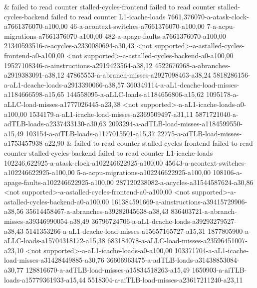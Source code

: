 &
failed to read counter stalled-cycles-frontend failed to read counter stalled-cycles-backend failed to read counter L1-icache-loads 7661,376070-a-atask-clock-a7661376070-a100,00 46-a-acontext-switches-a7661376070-a100,00 7-a-acpu-migrations-a7661376070-a100,00 482-a-apage-faults-a7661376070-a100,00 21340593516-a-acycles-a2330080694-a30,43 <not supported>-a-astalled-cycles-frontend-a0-a100,00 <not supported>-a-astalled-cycles-backend-a0-a100,00 19527108346-a-ainstructions-a2919423564-a38,12 4522676968-a-abranches-a2919383091-a38,12 47865553-a-abranch-misses-a2927098463-a38,24 5818286156-a-aL1-dcache-loads-a2913390066-a38,57 360349114-a-aL1-dcache-load-misses-a1184666598-a15,65 144558095-a-aLLC-loads-a1184656806-a15,62 1095178-a-aLLC-load-misses-a1777026445-a23,38 <not supported>-a-aL1-icache-loads-a0-a100,00 1534179-a-aL1-icache-load-misses-a2369509497-a31,11 5871721040-a-adTLB-loads-a2337433130-a30,63 2093294-a-adTLB-load-misses-a1184599550-a15,49 103154-a-aiTLB-loads-a1177015501-a15,37 22775-a-aiTLB-load-misses-a1753457938-a22,90
&
failed to read counter stalled-cycles-frontend failed to read counter stalled-cycles-backend failed to read counter L1-icache-loads 102246,622925-a-atask-clock-a102246622925-a100,00 45643-a-acontext-switches-a102246622925-a100,00 5-a-acpu-migrations-a102246622925-a100,00 108106-a-apage-faults-a102246622925-a100,00 287120238082-a-acycles-a31544587624-a30,86 <not supported>-a-astalled-cycles-frontend-a0-a100,00 <not supported>-a-astalled-cycles-backend-a0-a100,00 161384591669-a-ainstructions-a39415729906-a38,56 35614458467-a-abranches-a39282045638-a38,43 836403721-a-abranch-misses-a39346990054-a38,49 36796724706-a-aL1-dcache-loads-a39293279527-a38,43 5141353266-a-aL1-dcache-load-misses-a15657165727-a15,31 1877805900-a-aLLC-loads-a15704318172-a15,38 683184078-a-aLLC-load-misses-a23596451007-a23,10 <not supported>-a-aL1-icache-loads-a0-a100,00 103371704-a-aL1-icache-load-misses-a31428449885-a30,76 36606963475-a-adTLB-loads-a31438853084-a30,77 128816670-a-adTLB-load-misses-a15834518263-a15,49 1650903-a-aiTLB-loads-a15779361933-a15,44 5518304-a-aiTLB-load-misses-a23617211240-a23,11
